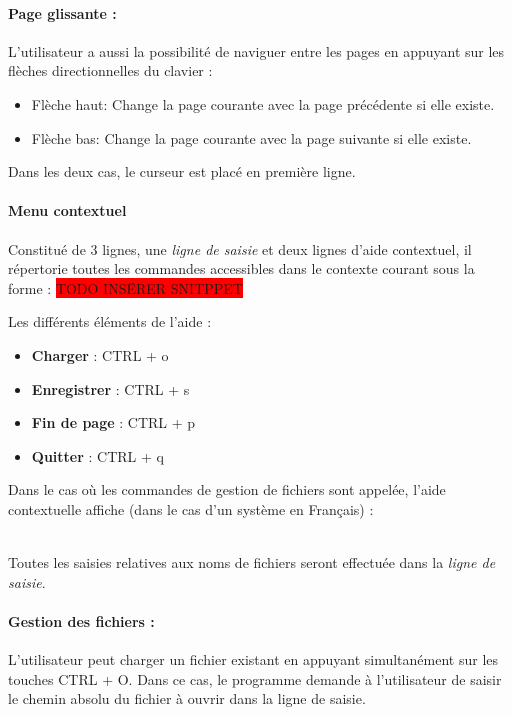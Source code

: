 \paragraph{Page glissante :}
L'utilisateur a aussi la possibilité de naviguer entre les pages en appuyant sur les flèches directionnelles du clavier :
\begin{itemize}
	\item \og Flèche haut\fg : Change la page courante avec la page précédente si elle existe.
	\item \og Flèche bas\fg : Change la page courante avec la page suivante si elle existe.
\end{itemize}
Dans les deux cas, le curseur est placé en première ligne.

\paragraph{Menu contextuel}
Constitué de 3 lignes, une \textsl{ligne de saisie} et deux lignes d'aide contextuel, il répertorie toutes les commandes accessibles dans le contexte courant sous la forme :
\colorbox{red}{TODO INSËRER SNITPPET}

Les différents éléments de l'aide :
\begin{itemize}
	\item \textbf{Charger} : \og CTRL + o\fg
	\item \textbf{Enregistrer} : \og CTRL + s\fg
	\item \textbf{Fin de page} : \og CTRL + p\fg
	\item \textbf{Quitter} : \og CTRL + q\fg
\end{itemize}

Dans le cas où les commandes de gestion de fichiers sont appelée, l'aide contextuelle affiche (dans le cas d'un système en Français) :\\
\begin{center}
\end{center}
~\\
Toutes les saisies relatives aux noms de fichiers seront effectuée dans la \textsl{ligne de saisie}.

\paragraph{Gestion des fichiers :}
L'utilisateur peut charger un fichier existant en appuyant simultanément sur les touches \og CTRL + O\fg. Dans ce cas, le programme demande à l'utilisateur de saisir le chemin absolu du fichier à ouvrir dans la ligne de saisie.

